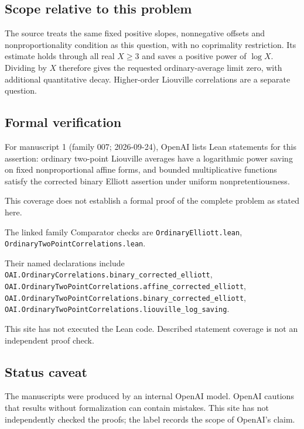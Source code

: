 \documentclass[11pt]{article}
\begin{document}
\subsection{Scope relative to this problem}
The source treats the same fixed positive slopes, nonnegative offsets and nonproportionality condition as this question, with no coprimality restriction. Its estimate holds through all real $X\ge3$ and saves a positive power of $\log X$. Dividing by $X$ therefore gives the requested ordinary-average limit zero, with additional quantitative decay. Higher-order Liouville correlations are a separate question.

\subsection{Formal verification}
For manuscript 1 (family 007; 2026-09-24), OpenAI lists Lean statements for this assertion: ordinary two-point Liouville averages have a logarithmic power saving on fixed nonproportional affine forms, and bounded multiplicative functions satisfy the corrected binary Elliott assertion under uniform nonpretentiousness.

This coverage does not establish a formal proof of the complete problem as stated here.

The linked family Comparator checks are \texttt{OrdinaryElliott.lean}, \texttt{OrdinaryTwoPointCorrelations.lean}.

Their named declarations include \texttt{OAI.OrdinaryCorrelations.binary\_corrected\_elliott}, \texttt{OAI.OrdinaryTwoPointCorrelations.affine\_corrected\_elliott}, \texttt{OAI.OrdinaryTwoPointCorrelations.binary\_corrected\_elliott}, \texttt{OAI.OrdinaryTwoPointCorrelations.liouville\_log\_saving}.

This site has not executed the Lean code. Described statement coverage is not an independent proof check.

\subsection{Status caveat}
The manuscripts were produced by an internal OpenAI model. OpenAI cautions that results without formalization can contain mistakes. This site has not independently checked the proofs; the label records the scope of OpenAI's claim.
\end{document}

